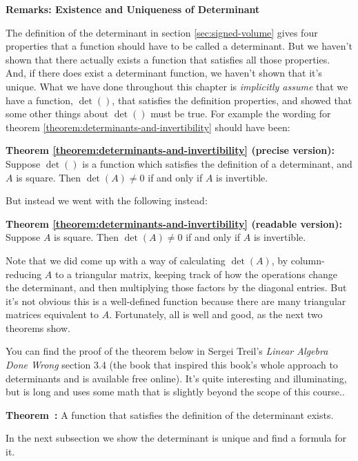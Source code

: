 \documentclass[11pt, letterpaper]{report}
\newenvironment{notes}{}{}
\newcounter{example}[section]
\newcounter{theorem}[chapter]
\newenvironment{theorem}[1][]{\refstepcounter{theorem}\begin{bbox}\par
    \noindent\textbf{Theorem~\thetheorem: #1}}{\end{bbox}}
\newlength\oldfboxsep%
\newlength\myminiwidth%
\newenvironment{bbox}{%
  \setlength\oldfboxsep\fboxsep
  \setlength{\fboxsep}{.1in}%
  \setlength\myminiwidth\linewidth%
  \addtolength\myminiwidth{-0.2in}%
  \vspace{0.1in}%
  \begin{lrbox}{\bboxbox}\begin{minipage}{\myminiwidth}%
    }{%
    \end{minipage}\end{lrbox}%
  \noindent\fbox{\usebox{\bboxbox}}\vspace{0.1in}\setlength\fboxsep\oldfboxsep%
}
\begin{document}
\textbf{Remarks: Existence and Uniqueness of Determinant}

The definition of the determinant in section \ref{sec:signed-volume} gives four properties that a function should have to be called a determinant. But we haven't shown that there actually exists a function that satisfies all those properties. And, if there does exist a determinant function, we haven't shown that it's unique. What we have done throughout this chapter is \emph{implicitly assume} that we have a function, $\det()$, that satisfies the definition properties, and showed that some other things about $\det()$ must be true. For example the wording for theorem \ref{theorem:determinants-and-invertibility} should have been:

\textbf{Theorem \ref{theorem:determinants-and-invertibility} (precise version):} Suppose $\det()$ is a function which satisfies the definition of a determinant, and $A$ is square. Then $\det(A) \ne 0$ if and only if $A$ is invertible.

But instead we went with the following instead:

\textbf{Theorem \ref{theorem:determinants-and-invertibility} (readable version):} Suppose $A$ is square. Then $\det(A) \ne 0$ if and only if $A$ is invertible.

Note that we did come up with a way of calculating $\det(A)$, by column-reducing $A$ to a triangular matrix, keeping track of how the operations change the determinant, and then multiplying those factors by the diagonal entries. But it's not obvious this is a well-defined function because there are many triangular matrices equivalent to $A$. Fortunately, all is well and good, as the next two theorems show. 

You can find the proof of the theorem below in Sergei Treil's \emph{Linear Algebra Done Wrong} section 3.4 (the book that inspired this book's whole approach to determinants and is available free online). It's quite interesting and illuminating, but is long and uses some math that is slightly beyond the scope of this course..

\begin{theorem}
\label{theorem:existence-of-determinants} A function that satisfies the definition of the determinant exists.
\end{theorem}

In the next subsection we show the determinant is unique and find a formula for it.

\begin{notes}
\newpage
\end{notes}
\end{document}

